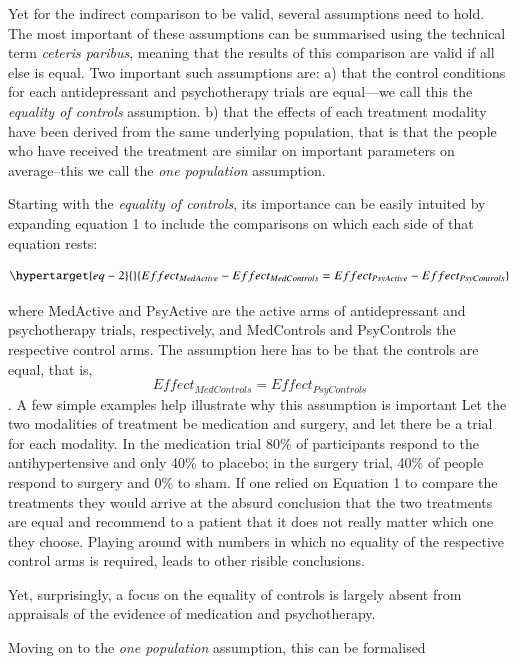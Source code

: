 \documentclass[
  super,
  preprint,
  3p]{elsarticle}
\begin{document}
Yet for the indirect comparison to be valid, several assumptions need to
hold. The most important of these assumptions can be summarised using
the technical term \emph{ceteris paribus}, meaning that the results of
this comparison are valid if all else is equal. Two important such
assumptions are: a) that the control conditions for each antidepressant
and psychotherapy trials are equal---we call this the \emph{equality of
controls} assumption. b) that the effects of each treatment modality
have been derived from the same underlying population, that is that the
people who have received the treatment are similar on important
parameters on average--this we call the \emph{one population}
assumption.

Starting with the \emph{equality of controls}, its importance can be
easily intuited by expanding equation 1 to include the comparisons on
which each side of that equation rests:

\begin{equation}\protect\hypertarget{eq-2}{}{Effect_{MedActive} - Effect_{MedControls} = Effect_{PsyActive} - Effect_{PsyControls}}\label{eq-2}\end{equation}

where MedActive and PsyActive are the active arms of antidepressant and
psychotherapy trials, respectively, and MedControls and PsyControls the
respective control arms. The assumption here has to be that the controls
are equal, that is, \[ Effect_{MedControls} = Effect_{PsyControls}\]. A
few simple examples help illustrate why this assumption is important Let
the two modalities of treatment be medication and surgery, and let there
be a trial for each modality. In the medication trial 80\% of
participants respond to the antihypertensive and only 40\% to placebo;
in the surgery trial, 40\% of people respond to surgery and 0\% to sham.
If one relied on Equation 1 to compare the treatments they would arrive
at the absurd conclusion that the two treatments are equal and recommend
to a patient that it does not really matter which one they choose.
Playing around with numbers in which no equality of the respective
control arms is required, leads to other risible conclusions.

Yet, surprisingly, a focus on the equality of controls is largely absent
from appraisals of the evidence of medication and psychotherapy.

Moving on to the \emph{one population} assumption, this can be
formalised

\citet{stringarisDevelopmentalPathwaysChildhood2014}
\end{document}
